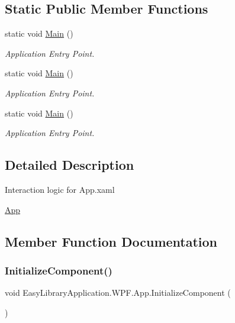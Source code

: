 \subsection*{Static Public Member Functions}
\begin{DoxyCompactItemize}
\item 
static void \mbox{\hyperlink{class_easy_library_application_1_1_w_p_f_1_1_app_a16bb18c07208bc2d3e71b75dd21850cd}{Main}} ()
\begin{DoxyCompactList}\small\item\em Application Entry Point. \end{DoxyCompactList}\item 
static void \mbox{\hyperlink{class_easy_library_application_1_1_w_p_f_1_1_app_a16bb18c07208bc2d3e71b75dd21850cd}{Main}} ()
\begin{DoxyCompactList}\small\item\em Application Entry Point. \end{DoxyCompactList}\item 
static void \mbox{\hyperlink{class_easy_library_application_1_1_w_p_f_1_1_app_a16bb18c07208bc2d3e71b75dd21850cd}{Main}} ()
\begin{DoxyCompactList}\small\item\em Application Entry Point. \end{DoxyCompactList}\end{DoxyCompactItemize}


\subsection{Detailed Description}
Interaction logic for App.\+xaml 

\mbox{\hyperlink{class_easy_library_application_1_1_w_p_f_1_1_app}{App}} 

\subsection{Member Function Documentation}
\mbox{\label{class_easy_library_application_1_1_w_p_f_1_1_app_a345468b068271f45134186bcbf118bce}} 
\subsubsection{\texorpdfstring{Initialize\+Component()}{InitializeComponent()}\hspace{0.1cm}{\footnotesize\ttfamily [1/3]}}
{\footnotesize\ttfamily void Easy\+Library\+Application.\+W\+P\+F.\+App.\+Initialize\+Component (\begin{DoxyParamCaption}{ }\end{DoxyParamCaption})}



